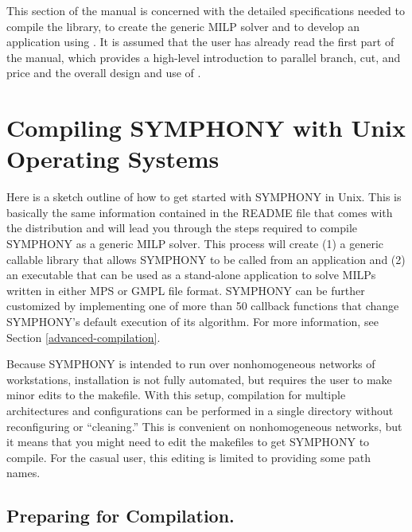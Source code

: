 This section of the manual is concerned with the detailed
specifications needed to compile the \BB library, to create the generic 
MILP solver and to develop an application using \BB. It is
assumed that the user has already read the first part of the manual, which
provides a high-level introduction to parallel branch, cut, and price
and the overall design and use of \BB. 


\section{Compiling SYMPHONY with Unix Operating Systems}
\label{getting_started_unix}

Here is a sketch outline of how to get started with SYMPHONY in Unix. This is
basically the same information contained in the README file that comes with
the distribution and will lead you through the steps required to compile
SYMPHONY as a generic MILP solver. This process will create (1) a generic
callable library that allows SYMPHONY to be called from an application and (2)
an executable that can be used as a stand-alone application to solve MILPs
written in either MPS or GMPL file format. SYMPHONY can be further customized
by implementing one of more than 50 callback functions that change SYMPHONY's
default execution of its algorithm. For more information, see Section
\ref{advanced-compilation}.

Because SYMPHONY is intended to run over nonhomogeneous networks of
workstations, installation is not fully automated, but requires the user to
make minor edits to the makefile. With this setup, compilation for multiple
architectures and configurations can be performed in a single directory
without reconfiguring or ``cleaning.'' This is convenient on nonhomogeneous
networks, but it means that you might need to edit the makefiles to get
SYMPHONY to compile. For the casual user, this editing is limited to providing
some path names.

\subsection{Preparing for Compilation.}

